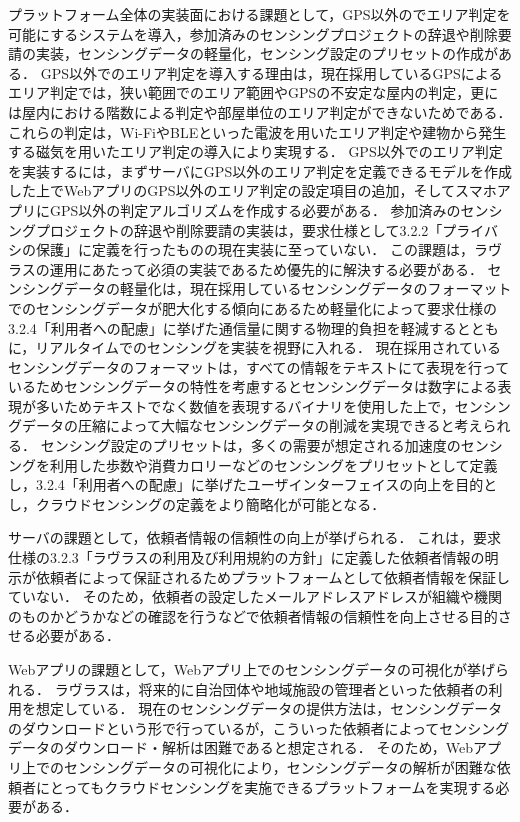 プラットフォーム全体の実装面における課題として，GPS以外のでエリア判定を可能にするシステムを導入，参加済みのセンシングプロジェクトの辞退や削除要請の実装，センシングデータの軽量化，センシング設定のプリセットの作成がある．
GPS以外でのエリア判定を導入する理由は，現在採用しているGPSによるエリア判定では，狭い範囲でのエリア範囲やGPSの不安定な屋内の判定，更には屋内における階数による判定や部屋単位のエリア判定ができないためである．
これらの判定は，Wi-FiやBLEといった電波を用いたエリア判定や建物から発生する磁気を用いたエリア判定の導入により実現する．
GPS以外でのエリア判定を実装するには，まずサーバにGPS以外のエリア判定を定義できるモデルを作成した上でWebアプリのGPS以外のエリア判定の設定項目の追加，そしてスマホアプリにGPS以外の判定アルゴリズムを作成する必要がある．
参加済みのセンシングプロジェクトの辞退や削除要請の実装は，要求仕様として3.2.2「プライバシの保護」に定義を行ったものの現在実装に至っていない．
この課題は，ラヴラスの運用にあたって必須の実装であるため優先的に解決する必要がある．
センシングデータの軽量化は，現在採用しているセンシングデータのフォーマットでのセンシングデータが肥大化する傾向にあるため軽量化によって要求仕様の3.2.4「利用者への配慮」に挙げた通信量に関する物理的負担を軽減するとともに，リアルタイムでのセンシングを実装を視野に入れる．
現在採用されているセンシングデータのフォーマットは，すべての情報をテキストにて表現を行っているためセンシングデータの特性を考慮するとセンシングデータは数字による表現が多いためテキストでなく数値を表現するバイナリを使用した上で，センシングデータの圧縮によって大幅なセンシングデータの削減を実現できると考えられる．
センシング設定のプリセットは，多くの需要が想定される加速度のセンシングを利用した歩数や消費カロリーなどのセンシングをプリセットとして定義し，3.2.4「利用者への配慮」に挙げたユーザインターフェイスの向上を目的とし，クラウドセンシングの定義をより簡略化が可能となる．

サーバの課題として，依頼者情報の信頼性の向上が挙げられる．
これは，要求仕様の3.2.3「ラヴラスの利用及び利用規約の方針」に定義した依頼者情報の明示が依頼者によって保証されるためプラットフォームとして依頼者情報を保証していない．
そのため，依頼者の設定したメールアドレスアドレスが組織や機関のものかどうかなどの確認を行うなどで依頼者情報の信頼性を向上させる目的させる必要がある．

Webアプリの課題として，Webアプリ上でのセンシングデータの可視化が挙げられる．
ラヴラスは，将来的に自治団体や地域施設の管理者といった依頼者の利用を想定している．
現在のセンシングデータの提供方法は，センシングデータのダウンロードという形で行っているが，こういった依頼者によってセンシングデータのダウンロード・解析は困難であると想定される．
そのため，Webアプリ上でのセンシングデータの可視化により，センシングデータの解析が困難な依頼者にとってもクラウドセンシングを実施できるプラットフォームを実現する必要がある．

